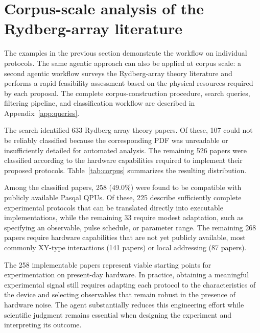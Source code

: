 \documentclass[aps,pra,reprint,amssymb,superscriptaddress,nofootinbib,floatfix]{revtex4-2}
\begin{document}
\section{Corpus-scale analysis of the Rydberg-array literature}\label{sec:all_rydberg_lit}

The examples in the previous section demonstrate the workflow on individual protocols. The same agentic approach can also be applied at corpus scale: a second agentic workflow surveys the Rydberg-array theory literature and performs a rapid feasibility assessment based on the physical resources required by each proposal. The complete corpus-construction procedure, search queries, filtering pipeline, and classification workflow are described in Appendix~\ref{app:queries}.

The search identified 633 Rydberg-array theory papers. Of these, 107 could not be reliably classified because the corresponding PDF was unreadable or insufficiently detailed for automated analysis. The remaining 526 papers were classified according to the hardware capabilities required to implement their proposed protocols. Table~\ref{tab:corpus} summarizes the resulting distribution.

Among the classified papers, 258 ($49.0\%$) were found to be compatible with publicly available Pasqal QPUs. Of these, 225 describe sufficiently complete experimental protocols that can be translated directly into executable implementations, while the remaining 33 require modest adaptation, such as specifying an observable, pulse schedule, or parameter range. The remaining 268 papers require hardware capabilities that are not yet publicly available, most commonly XY-type interactions (141 papers) or local addressing (87 papers).

The 258 implementable papers represent viable starting points for experimentation on present-day hardware. In practice, obtaining a meaningful experimental signal still requires adapting each protocol to the characteristics of the device and selecting observables that remain robust in the presence of hardware noise. The agent substantially reduces this engineering effort while scientific judgment remains essential when designing the experiment and interpreting its outcome.
\end{document}
